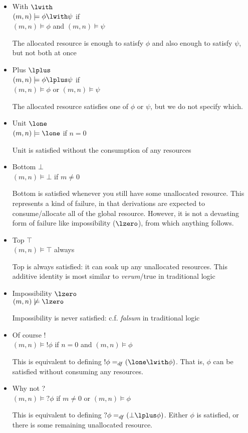 \begin{itemize}
\item With $\lwith$\\
$(m,n) \models \phi\lwith\psi$ if\\
$(m,n) \models \phi$ and $(m,n) \models \psi$

The allocated resource is enough to satisfy $\phi$ and also enough to
satisfy $\psi$, but not both at once

\item Plus $\lplus$\\
$(m,n) \models \phi\lplus\psi$ if\\
$(m,n) \models \phi$ or $(m,n) \models \psi$

The allocated resource satisfies one of $\phi$ or $\psi$, but we do
not specify which.

\item Unit $\lone$\\
$(m,n) \models \lone$ if $n=0$

Unit is satisfied without the consumption of any resources

\item Bottom $\bot$\\
$(m,n) \models \bot$ if $m\not = 0$

Bottom is satisfied whenever you still have some unallocated resource.
This represents a kind of failure, in that derivations are expected to
consume/allocate all of the global resource.  However, it is not a
devasting form of failure like impossibility ($\lzero$), from which
anything follows.

\item Top $\top$\\
$(m,n) \models \top$ always

Top is always satisfied: it can soak up any unallocated resources.
This additive identity is most similar to {\it verum}/true in traditional logic

\item Impossibility $\lzero$\\
$(m,n) \not\models \lzero$

Impossibility is never satisfied: c.f. {\it falsum} in traditional
logic

\item Of course !\\
$(m,n) \models !\phi$ if $n=0$ and $(m,n) \models \phi$

This is equivalent to defining $!\phi =_{df} (\lone\lwith\phi)$.  That
is, $\phi$ can be satisfied without consuming any resources.

\item Why not ?\\
$(m,n) \models ?\phi$ if $m\not =0$ or $(m,n) \models \phi$

This is equivalent to defining $?\phi =_{df} (\bot\lplus\phi)$.  Either
$\phi$ is satisfied, or there is some remaining unallocated resource.
\end{itemize}
 
